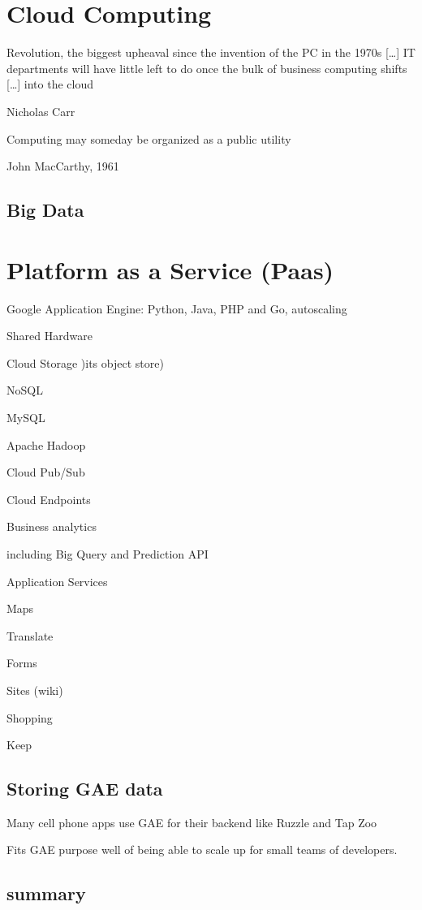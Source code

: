 \chapter{Cloud Computing}

\epigraph{Revolution, the biggest upheaval since the invention of the PC in the 1970s [\ldots] IT departments will have little left to do once the bulk of
business computing shifts [\ldots] into the cloud}{Nicholas Carr}

\epigraph{Computing may someday be organized as a public utility}{John MacCarthy, 1961}


\section{Big Data}

\chapter{Platform as a Service (Paas)}

Google Application Engine: Python, Java, PHP and Go, autoscaling

Shared Hardware

Cloud Storage )its object store)

NoSQL

MySQL

Apache Hadoop

Cloud Pub/Sub

Cloud Endpoints

Business analytics

including Big Query and Prediction API

Application Services

Maps

Translate

Forms

Sites (wiki)

Shopping

Keep


\section{Storing GAE data}

Many cell phone apps use GAE for their backend like Ruzzle and Tap Zoo

Fits GAE purpose well of being able to scale up for small teams of developers.

\section{summary}

